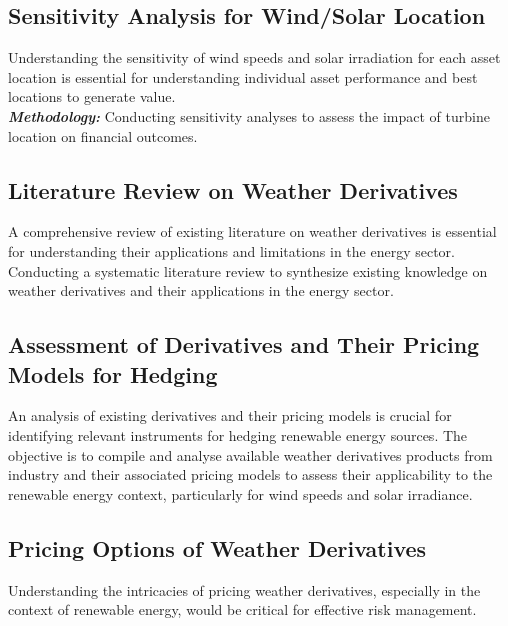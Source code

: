 \subsection{Sensitivity Analysis for Wind/Solar Location}
    \label{subsec:rs_sensitivity-analysis-for-wind/solar-location}

    Understanding the sensitivity of wind speeds and solar irradiation for each asset location
    is essential for understanding individual asset performance and best locations to generate value.\\

    \textbf{\textit{Methodology: }} Conducting sensitivity analyses to assess the impact
        of turbine location on financial outcomes.

\subsection{Literature Review on Weather Derivatives}
    \label{subsec:rs_literature-review-on-weather-derivatives}

    A comprehensive review of existing literature on weather derivatives is essential for understanding their
    applications and limitations in the energy sector.
    Conducting a systematic literature review to synthesize existing knowledge on
    weather derivatives and their applications in the energy sector.

\subsection{Assessment of Derivatives and Their Pricing Models for Hedging}
    \label{subsec:rs_assessment-of-derivatives-and-pricing-models}

    An analysis of existing derivatives and their pricing models is crucial for identifying
    relevant instruments for hedging renewable energy sources.
    The objective is to compile and analyse available weather derivatives products from industry and their
    associated pricing models to assess their applicability to the renewable energy context,
    particularly for wind speeds and solar irradiance.

\subsection{Pricing Options of Weather Derivatives}
    \label{subsec:rs_pricing-options-of-weather-derivatives}

    Understanding the intricacies of pricing weather derivatives, especially in the context of renewable energy,
    would be critical for effective risk management.\\

